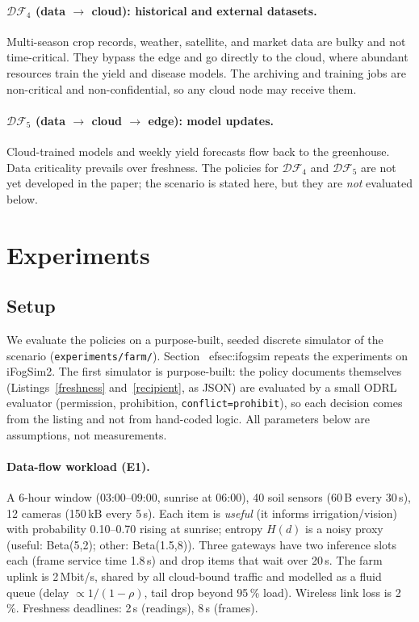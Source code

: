 \paragraph{$\mathcal{DF}_4$ (data $\rightarrow$ cloud): historical and external datasets.}
Multi-season crop records, weather, satellite, and market data are bulky and not time-critical. They bypass the edge
and go directly to the cloud, where abundant resources train the yield and disease models. The archiving and training
jobs are non-critical and non-confidential, so any cloud node may receive them.

\paragraph{$\mathcal{DF}_5$ (data $\rightarrow$ cloud $\rightarrow$ edge): model updates.}
Cloud-trained models and weekly yield forecasts flow back to the greenhouse. Data criticality prevails over freshness.
The policies for $\mathcal{DF}_4$ and $\mathcal{DF}_5$ are not yet developed in the paper; the scenario is stated here,
but they are \emph{not} evaluated below.

\section{Experiments}\label{sec:experiments}

\subsection{Setup}
We evaluate the policies on a purpose-built, seeded discrete simulator of the scenario (\texttt{experiments/farm/}).
Section~
ef{sec:ifogsim} repeats the experiments on iFogSim2. The first simulator is purpose-built: the policy documents themselves (Listings~\ref{freshness} and~\ref{recipient}, as JSON) are
evaluated by a small ODRL evaluator (permission, prohibition, \texttt{conflict=prohibit}), so each decision comes from
the listing and not from hand-coded logic. All parameters below are assumptions, not measurements.

\paragraph{Data-flow workload (E1).} A 6-hour window (03:00--09:00, sunrise at 06:00), 40 soil sensors (60\,B every
30\,s), 12 cameras (150\,kB every 5\,s). Each item is \emph{useful} (it informs irrigation/vision) with probability
0.10--0.70 rising at sunrise; entropy $H(d)$ is a noisy proxy (useful: Beta(5,2); other: Beta(1.5,8)). Three
gateways have two inference slots each (frame service time 1.8\,s) and drop items that wait over 20\,s. The farm
uplink is 2\,Mbit/s, shared by all cloud-bound traffic and modelled as a fluid queue (delay $\propto 1/(1-\rho)$,
tail drop beyond 95\,\% load). Wireless link loss is 2\,\%. Freshness deadlines: 2\,s (readings), 8\,s (frames).

